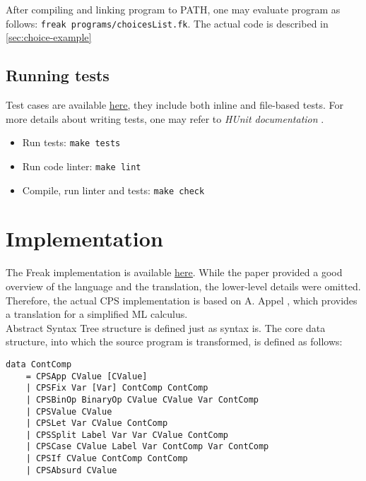 \documentclass{article}
\theoremstyle{definition}
\theoremstyle{lemma}
\theoremstyle{observation}
\theoremstyle{theorem}
\newcommand*{\fullref}[1]{\hyperref[{#1}]{\autoref*{#1} \nameref*{#1}}}
\begin{document}
    After compiling and linking program to PATH, one may evaluate program as
    follows: \verb!freak programs/choicesList.fk!. The actual code is described in \fullref{sec:choice-example}

    \subsection{Running tests}

    Test cases are available \href{https://github.com/Tomatosoup97/freak/blob/master/src/Tests.hs}{\underline{here}},
    they include both inline and file-based tests. For more details about
    writing tests, one may refer to \textit{HUnit documentation} \cite{hunit-docs}. \\

    \begin{itemize}
        \item Run tests: \verb!make tests!
        \item Run code linter: \verb!make lint!
        \item Compile, run linter and tests: \verb!make check!
    \end{itemize}

\section{Implementation}

    The Freak implementation is available \href{https://github.com/Tomatosoup97/freak}{\underline{here}}.
    While the paper provided a good overview of the language and the translation,
    the lower-level details were omitted. Therefore, the actual CPS implementation
    is based on A. Appel \cite{appel-continuations}, which provides a translation
    for a simplified ML calculus. \\

    Abstract Syntax Tree structure is defined just as syntax is. The core data
    structure, into which the source program is transformed, is defined as follows:

    \begin{verbatim}
data ContComp
    = CPSApp CValue [CValue]
    | CPSFix Var [Var] ContComp ContComp
    | CPSBinOp BinaryOp CValue CValue Var ContComp
    | CPSValue CValue
    | CPSLet Var CValue ContComp
    | CPSSplit Label Var Var CValue ContComp
    | CPSCase CValue Label Var ContComp Var ContComp
    | CPSIf CValue ContComp ContComp
    | CPSAbsurd CValue
    \end{verbatim}
\end{document}
